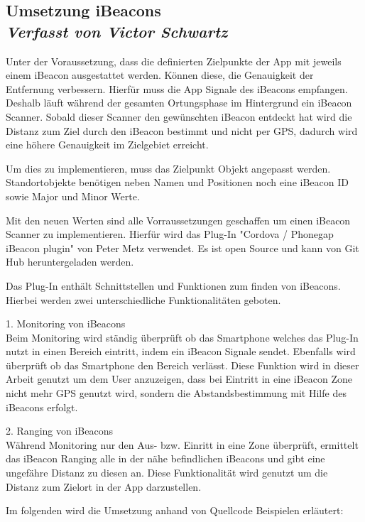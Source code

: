 \subsection[Umsetzung iBeacons]{Umsetzung iBeacons
 \\ \textnormal{\small{\textit {Verfasst von Victor Schwartz}}}}

Unter der Voraussetzung, dass die definierten Zielpunkte der App mit jeweils einem iBeacon ausgestattet werden. Können diese, die Genauigkeit der Entfernung verbessern.
Hierfür muss die App Signale des iBeacons empfangen. Deshalb läuft während der gesamten Ortungsphase im Hintergrund ein iBeacon Scanner. Sobald dieser Scanner den gewünschten iBeacon entdeckt hat wird die Distanz zum Ziel durch den iBeacon bestimmt und nicht per GPS, dadurch wird eine höhere Genauigkeit im Zielgebiet erreicht.

Um dies zu implementieren, muss das Zielpunkt Objekt angepasst werden. Standortobjekte benötigen neben Namen und Positionen noch eine iBeacon ID sowie Major und Minor Werte.

Mit den neuen Werten sind alle Vorraussetzungen geschaffen um einen iBeacon Scanner zu implementieren. Hierfür wird das Plug-In "Cordova / Phonegap iBeacon plugin" von Peter Metz verwendet. \cite{petermetz} Es ist open Source und kann von Git Hub heruntergeladen werden.

Das Plug-In enthält Schnittstellen und Funktionen zum finden von iBeacons. Hierbei werden zwei unterschiedliche Funktionalitäten geboten.


1. Monitoring von iBeacons
\\Beim Monitoring wird ständig überprüft ob das Smartphone welches das Plug-In nutzt in einen Bereich eintritt, indem ein iBeacon Signale sendet. Ebenfalls wird überprüft ob das Smartphone den Bereich verlässt. Diese Funktion wird in dieser Arbeit genutzt um dem User anzuzeigen, dass bei Eintritt in eine iBeacon Zone nicht mehr GPS genutzt wird, sondern die Abstandsbestimmung mit Hilfe des iBeacons erfolgt.

2. Ranging von iBeacons
\\Während Monitoring nur den Aus- bzw. Einritt in eine Zone überprüft, ermittelt das iBeacon Ranging alle in der nähe befindlichen iBeacons und gibt eine ungefähre Distanz zu diesen an. Diese Funktionalität wird genutzt um die Distanz zum Zielort in der App darzustellen.\cite{MonitorRange}


Im folgenden wird die Umsetzung anhand von Quellcode Beispielen erläutert:

